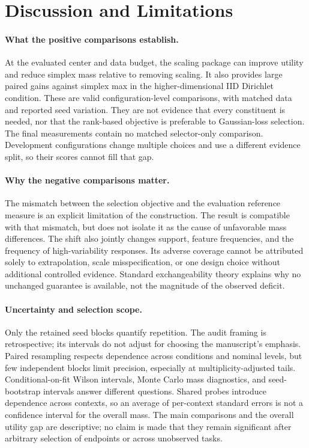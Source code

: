 \documentclass{article}
\begin{document}
\section{Discussion and Limitations}
\paragraph{What the positive comparisons establish.}
At the evaluated center and data budget, the scaling package can improve utility and reduce simplex mass relative to removing scaling. It also provides large paired gains against simplex max in the higher-dimensional IID Dirichlet condition. These are valid configuration-level comparisons, with matched data and reported seed variation. They are not evidence that every constituent is needed, nor that the rank-based objective is preferable to Gaussian-loss selection. The final measurements contain no matched selector-only comparison. Development configurations change multiple choices and use a different evidence split, so their scores cannot fill that gap.

\paragraph{Why the negative comparisons matter.}
The mismatch between the selection objective and the evaluation reference measure is an explicit limitation of the construction. The result is compatible with that mismatch, but does not isolate it as the cause of unfavorable mass differences. The shift also jointly changes support, feature frequencies, and the frequency of high-variability responses. Its adverse coverage cannot be attributed solely to extrapolation, scale misspecification, or one design choice without additional controlled evidence. Standard exchangeability theory explains why no unchanged guarantee is available, not the magnitude of the observed deficit.

\paragraph{Uncertainty and selection scope.}
Only the retained seed blocks quantify repetition. The audit framing is retrospective; its intervals do not adjust for choosing the manuscript's emphasis. Paired resampling respects dependence across conditions and nominal levels, but few independent blocks limit precision, especially at multiplicity-adjusted tails. Conditional-on-fit Wilson intervals, Monte Carlo mass diagnostics, and seed-bootstrap intervals answer different questions. Shared probes introduce dependence across contexts, so an average of per-context standard errors is not a confidence interval for the overall mass. The main comparisons and the overall utility gap are descriptive; no claim is made that they remain significant after arbitrary selection of endpoints or across unobserved tasks.
\end{document}
